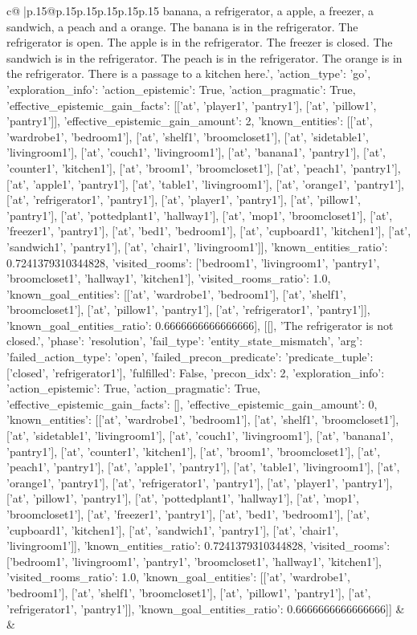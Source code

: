 \documentclass{article}
\begin{document}
{\begin{supertabular}{c@{$\;$}|p{.15\linewidth}@{}p{.15\linewidth}p{.15\linewidth}p{.15\linewidth}p{.15\linewidth}p{.15\linewidth}}
{{{banana, a refrigerator, a apple, a freezer, a sandwich, a peach and a orange. The banana is in the refrigerator. The refrigerator is open. The apple is in the refrigerator. The freezer is closed. The sandwich is in the refrigerator. The peach is in the refrigerator. The orange is in the refrigerator. There is a passage to a kitchen here.', {'action_type': 'go', 'exploration_info': {'action_epistemic': True, 'action_pragmatic': True, 'effective_epistemic_gain_facts': [['at', 'player1', 'pantry1'], ['at', 'pillow1', 'pantry1']], 'effective_epistemic_gain_amount': 2, 'known_entities': [['at', 'wardrobe1', 'bedroom1'], ['at', 'shelf1', 'broomcloset1'], ['at', 'sidetable1', 'livingroom1'], ['at', 'couch1', 'livingroom1'], ['at', 'banana1', 'pantry1'], ['at', 'counter1', 'kitchen1'], ['at', 'broom1', 'broomcloset1'], ['at', 'peach1', 'pantry1'], ['at', 'apple1', 'pantry1'], ['at', 'table1', 'livingroom1'], ['at', 'orange1', 'pantry1'], ['at', 'refrigerator1', 'pantry1'], ['at', 'player1', 'pantry1'], ['at', 'pillow1', 'pantry1'], ['at', 'pottedplant1', 'hallway1'], ['at', 'mop1', 'broomcloset1'], ['at', 'freezer1', 'pantry1'], ['at', 'bed1', 'bedroom1'], ['at', 'cupboard1', 'kitchen1'], ['at', 'sandwich1', 'pantry1'], ['at', 'chair1', 'livingroom1']], 'known_entities_ratio': 0.7241379310344828, 'visited_rooms': ['bedroom1', 'livingroom1', 'pantry1', 'broomcloset1', 'hallway1', 'kitchen1'], 'visited_rooms_ratio': 1.0, 'known_goal_entities': [['at', 'wardrobe1', 'bedroom1'], ['at', 'shelf1', 'broomcloset1'], ['at', 'pillow1', 'pantry1'], ['at', 'refrigerator1', 'pantry1']], 'known_goal_entities_ratio': 0.6666666666666666}}], [[], 'The refrigerator is not closed.', {'phase': 'resolution', 'fail_type': 'entity_state_mismatch', 'arg': {'failed_action_type': 'open', 'failed_precon_predicate': {'predicate_tuple': ['closed', 'refrigerator1'], 'fulfilled': False, 'precon_idx': 2}}, 'exploration_info': {'action_epistemic': True, 'action_pragmatic': True, 'effective_epistemic_gain_facts': [], 'effective_epistemic_gain_amount': 0, 'known_entities': [['at', 'wardrobe1', 'bedroom1'], ['at', 'shelf1', 'broomcloset1'], ['at', 'sidetable1', 'livingroom1'], ['at', 'couch1', 'livingroom1'], ['at', 'banana1', 'pantry1'], ['at', 'counter1', 'kitchen1'], ['at', 'broom1', 'broomcloset1'], ['at', 'peach1', 'pantry1'], ['at', 'apple1', 'pantry1'], ['at', 'table1', 'livingroom1'], ['at', 'orange1', 'pantry1'], ['at', 'refrigerator1', 'pantry1'], ['at', 'player1', 'pantry1'], ['at', 'pillow1', 'pantry1'], ['at', 'pottedplant1', 'hallway1'], ['at', 'mop1', 'broomcloset1'], ['at', 'freezer1', 'pantry1'], ['at', 'bed1', 'bedroom1'], ['at', 'cupboard1', 'kitchen1'], ['at', 'sandwich1', 'pantry1'], ['at', 'chair1', 'livingroom1']], 'known_entities_ratio': 0.7241379310344828, 'visited_rooms': ['bedroom1', 'livingroom1', 'pantry1', 'broomcloset1', 'hallway1', 'kitchen1'], 'visited_rooms_ratio': 1.0, 'known_goal_entities': [['at', 'wardrobe1', 'bedroom1'], ['at', 'shelf1', 'broomcloset1'], ['at', 'pillow1', 'pantry1'], ['at', 'refrigerator1', 'pantry1']], 'known_goal_entities_ratio': 0.6666666666666666}}]] 
	  } 
	   } 
	   } 
	 & & \\ 
 


\end{supertabular}}
\end{document}
